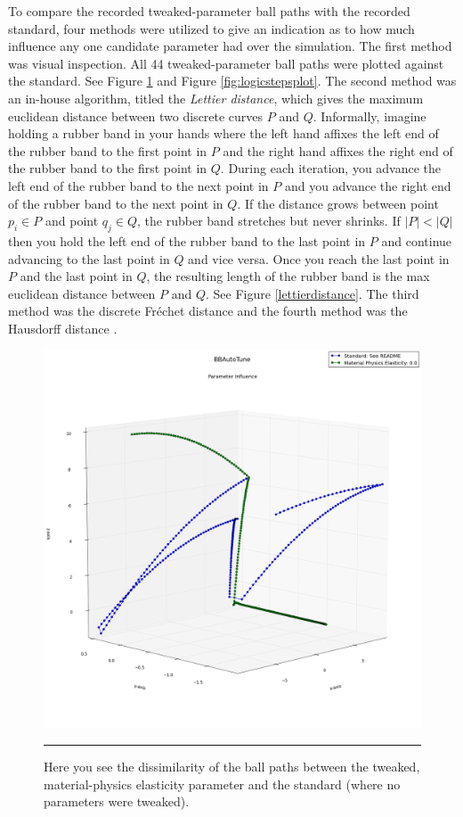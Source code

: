 To compare the recorded tweaked-parameter ball paths with the recorded standard, four methods were utilized to give an indication as to how much influence any one candidate parameter had over the simulation. The first method was visual inspection. All 44 tweaked-parameter ball paths were plotted against the standard. See Figure \ref{fig:matphysplot} and Figure \ref{fig:logicstepsplot}. The second method was an in-house algorithm, titled the \textit{Lettier distance}, which gives the maximum euclidean distance between two discrete curves $P$ and $Q$. Informally, imagine holding a rubber band in your hands where the left hand affixes the left end of the rubber band to the first point in $P$ and the right hand affixes the right end of the rubber band to the first point in $Q$. During each iteration, you advance the left end of the rubber band to the next point in $P$ and you advance the right end of the rubber band to the next point in $Q$. If the distance grows between point $p_i\in P$ and point $q_j \in Q$, the rubber band stretches but never shrinks. If $|P|<|Q|$ then you hold the left end of the rubber band to the last point in $P$ and continue advancing to the last point in $Q$ and vice versa. Once you reach the last point in $P$ and the last point in $Q$, the resulting length of the rubber band is the max euclidean distance between $P$ and $Q$. See Figure \ref{lettierdistance}. The third method was the discrete Fr{\'e}chet distance and the fourth method was the Hausdorff distance \cite{frechet} \cite{hausdorff}.

\begin{figure}[htbp]
\centering
\includegraphics[scale=0.35]{../Figures/Chapter4/material_physics_ball_plot.png}
\rule{35em}{0.5pt}
\caption[Physics Engine Racquetball Path Dissimilarity]{Here you see the dissimilarity of the ball paths between the tweaked, material-physics elasticity parameter and the standard (where no parameters were tweaked).}
\label{fig:matphysplot}
\end{figure}

